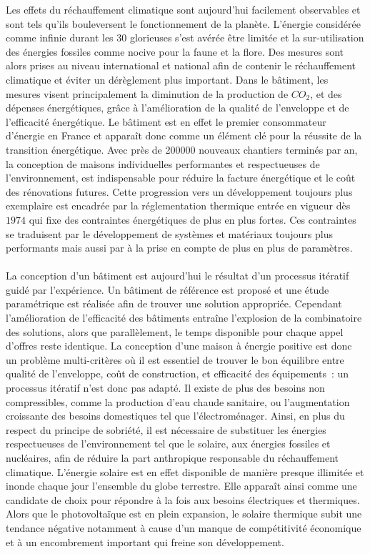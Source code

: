 

Les effets du réchauffement climatique sont aujourd’hui facilement observables et sont
tels qu’ils bouleversent le fonctionnement de la planète. L’énergie considérée comme
infinie durant les \num{30} glorieuses s’est avérée être limitée et la sur-utilisation des
énergies fossiles comme nocive pour la faune et la flore. Des mesures sont alors prises au
niveau international et national afin de contenir le réchauffement climatique et éviter un
dérèglement plus important. Dans le bâtiment, les mesures visent principalement la
diminution de la production de $CO_{2}$, et des dépenses énergétiques, grâce à
l’amélioration de la qualité de l’enveloppe et de l’efficacité énergétique. Le bâtiment
est en effet le premier consommateur d’énergie en France et apparaît donc comme un élément
clé pour la réussite de la transition énergétique. Avec près de \num{200000} nouveaux
chantiers terminés par an, la conception de maisons individuelles performantes et
respectueuses de l’environnement, est indispensable pour réduire la facture énergétique et
le coût des rénovations futures. Cette progression vers un développement toujours plus
exemplaire est encadrée par la réglementation thermique entrée en vigueur dès $1974$ qui
fixe des contraintes énergétiques de plus en plus fortes. Ces contraintes
se traduisent par le développement de systèmes et matériaux toujours plus performants
mais aussi par à la prise en compte de plus en plus de paramètres.

\paragraph{} %
La conception d’un bâtiment est aujourd’hui le résultat d’un processus itératif guidé par
l’expérience. Un bâtiment de référence est proposé et une étude paramétrique est réalisée
afin de trouver une solution appropriée. Cependant l’amélioration de l’efficacité des
bâtiments entraîne l’explosion de la combinatoire des solutions, alors que parallèlement,
le temps disponible pour chaque appel d’offres reste identique. La conception d’une
maison à énergie positive est donc un problème multi-critères où il est essentiel de
trouver le bon équilibre entre qualité de l’enveloppe, coût de construction, et efficacité
des équipements~: un processus itératif n’est donc pas adapté. Il existe de plus des
besoins non compressibles, comme la production d’eau chaude sanitaire, ou l’augmentation
croissante des besoins domestiques tel que l’électroménager. Ainsi, en plus du respect du
principe de sobriété, il est nécessaire de substituer les énergies respectueuses de
l’environnement tel que le solaire, aux énergies fossiles et nucléaires, afin de réduire la
part anthropique responsable du réchauffement climatique. L’énergie solaire est en effet
disponible de manière presque illimitée et inonde chaque jour l’ensemble du globe
terrestre. Elle apparaît ainsi comme une candidate de choix pour répondre à la fois aux
besoins électriques et thermiques. Alors que le photovoltaïque est en plein expansion, le
solaire thermique subit une tendance négative notamment à cause d’un manque de
compétitivité économique et à un encombrement important qui freine son développement.

